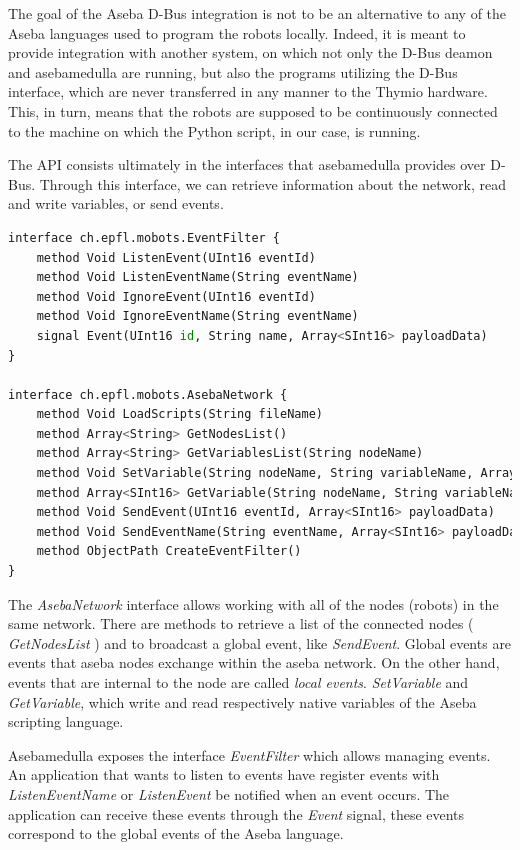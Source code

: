 \documentclass[format=acmsmall, review=false, screen=true]{acmart}
\begin{document}
The goal of the Aseba D-Bus integration is not to be an alternative to any of the Aseba languages used to program the robots locally. Indeed, it is meant to provide integration with another system, on which not only the D-Bus deamon and asebamedulla are running, but also the programs utilizing the D-Bus interface, which are never transferred in any manner to the Thymio hardware. This, in turn, means that the robots are supposed to be continuously connected to the machine on which the Python script, in our case, is running.

The API consists ultimately in the interfaces that asebamedulla provides over D-Bus. Through this interface, we can retrieve information about the network, read and write variables, or send events.

\begin{lstlisting}[caption={\ The API that asebamedulla provides over D-Bus},language=Python,captionpos=b,label={Asebamedulla API},basicstyle=\small]
interface ch.epfl.mobots.EventFilter {
    method Void ListenEvent(UInt16 eventId)
    method Void ListenEventName(String eventName)
    method Void IgnoreEvent(UInt16 eventId)
    method Void IgnoreEventName(String eventName)
    signal Event(UInt16 id, String name, Array<SInt16> payloadData)
}

interface ch.epfl.mobots.AsebaNetwork {
    method Void LoadScripts(String fileName)
    method Array<String> GetNodesList()
    method Array<String> GetVariablesList(String nodeName)
    method Void SetVariable(String nodeName, String variableName, Array<SInt16> variableData)
    method Array<SInt16> GetVariable(String nodeName, String variableName)
    method Void SendEvent(UInt16 eventId, Array<SInt16> payloadData)
    method Void SendEventName(String eventName, Array<SInt16> payloadData)
    method ObjectPath CreateEventFilter()
}
\end{lstlisting}


The \emph{AsebaNetwork} interface allows working with all of the nodes (robots) in the same network. There are methods to retrieve a list of the connected nodes ( \emph{GetNodesList} ) and to broadcast a global event, like \emph{SendEvent}. Global events are events that aseba nodes exchange within the aseba network. On the other hand, events that are internal to the node are called \emph{local events}. \emph{SetVariable} and \emph{GetVariable}, which write and read respectively native variables of the Aseba scripting language.

Asebamedulla exposes the interface \emph{EventFilter} which allows managing events. An application that wants to listen to events have register events with \emph{ListenEventName} or \emph    {ListenEvent} be notified when an event occurs. The application can receive these events through the \emph{Event} signal, these events correspond to the global events of the Aseba language.
\end{document}
